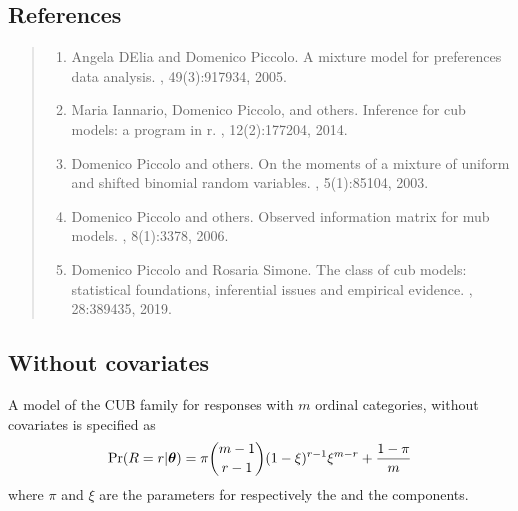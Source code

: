 \documentclass[letterpaper,10pt,english]{sphinxmanual}
\begin{document}
\subsection{References}
\label{\detokenize{manual:references}}\begin{quote}
\begin{enumerate}
%
\setcounter{enumi}{0}
\item {} 
\sphinxAtStartPar
Angela D\textquotesingle{}Elia and Domenico Piccolo. A mixture model for preferences data analysis. , 49(3):917\textendash{}934, 2005.

\item {} 
\sphinxAtStartPar
Maria Iannario, Domenico Piccolo, and others. Inference for cub models: a program in r. , 12(2):177\textendash{}204, 2014.

\item {} 
\sphinxAtStartPar
Domenico Piccolo and others. On the moments of a mixture of uniform and shifted binomial random variables. , 5(1):85\textendash{}104, 2003.

\item {} 
\sphinxAtStartPar
Domenico Piccolo and others. Observed information matrix for mub models. , 8(1):33\textendash{}78, 2006.

\item {} 
\sphinxAtStartPar
Domenico Piccolo and Rosaria Simone. The class of cub models: statistical foundations, inferential issues and empirical evidence. , 28:389\textendash{}435, 2019.

\end{enumerate}
\end{quote}


\subsection{Without covariates}
\label{\detokenize{manual:without-covariates}}
\sphinxAtStartPar
A model of the CUB family for responses with \(m\) ordinal categories, without covariates is specified as
\begin{equation*}
\begin{split}\Pr(R=r|\boldsymbol{\theta}) = \pi \dbinom{m-1}{r-1}(1-\xi)^{r-1}\xi^{m-r}+\dfrac{1-\pi}{m}\end{split}
\end{equation*}
\sphinxAtStartPar
where \(\pi\) and \(\xi\) are the parameters for respectively the  and the
 components.
\end{document}
